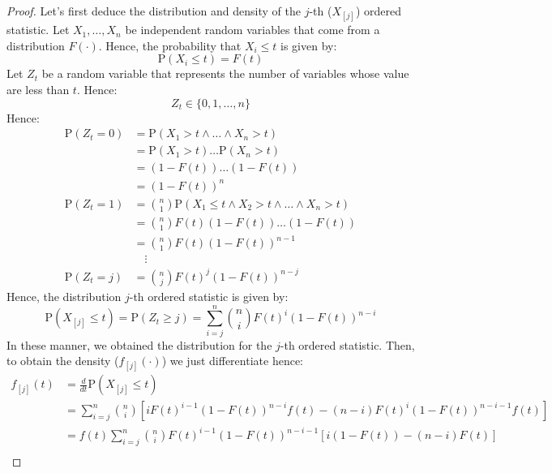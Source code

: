 \documentclass[11pt]{article}
\theoremstyle{definition}
\theoremstyle{remark}
\theoremstyle{remark}
\renewcommand{\P}[1]{\mathrm{P}\left(#1 \right)}
\begin{document}
\begin{proof}
  Let's first deduce the distribution and density of the $j$-th
  ($X_{[j]}$) ordered statistic. Let $X_1, \ldots, X_n$ be independent
  random variables that come from a distribution $F(\cdot)$. Hence,
  the probability that $X_i \le t$ is given by:
  \begin{equation*}
    \P{X_i \le t} = F(t)
  \end{equation*}
  Let $Z_t$ be a random variable that represents the number of
  variables whose value are less than $t$. Hence:
  \begin{equation*}
    Z_t \in \{0, 1, \ldots, n\}
  \end{equation*}
  Hence:
  \begin{align*}
    \P{Z_t = 0} &= \P{X_1 > t \wedge \ldots \wedge X_n>t} \\
                &= \P{X_1 > t} \ldots \P{X_n > t} \\
                &= (1 - F(t))\ldots (1 - F(t)) \\
                &= (1 - F(t))^n \\
    \P{Z_t = 1} &= \binom{n}{1} \P{X_1 \le t \wedge X_2 > t \wedge \ldots \wedge X_n > t} \\
                &=\binom{n}{1} F(t) (1 - F(t)) \ldots (1 - F(t)) \\
                &= \binom{n}{1} F(t) (1 - F(t))^{n-1} \\
                &\quad \vdots \\
    \P{Z_t = j} &= \binom{n}{j} F(t)^j (1 - F(t))^{n - j}
  \end{align*}
  Hence, the distribution $j$-th ordered statistic is given by:
  \begin{equation*}
    \label{eq:jth}
    \P{X_{[j]} \le t} = \P{Z_t \ge j} = \sum_{i=j}^n \binom{n}{i} F(t)^i (1 - F(t))^{n - i}
  \end{equation*}
  In these manner, we obtained the distribution for the $j$-th ordered
  statistic. Then, to obtain the density ($f_{[j]}(\cdot)$) we just
  differentiate hence:
  \begin{align*}
    f_{[j]}(t) &= \frac{d}{dt} \P{X_{[j]} \le t} \\
               &= \sum_{i=j}^n \binom{n}{i} \left[i F(t)^{i-1}(1 - F(t))^{n-i}f(t) -
                  (n - i) F(t)^i(1 - F(t))^{n-i-1}f(t)\right] \\
               &= f(t)\sum_{i=j}^n \binom{n}{i}F(t)^{i-1}(1-F(t))^{n-i-1}\left[i(1 - F(t))
                 - (n - i)F(t)\right] \\

\end{align*}
\end{proof}
\end{document}
